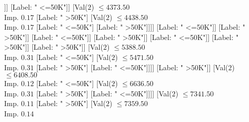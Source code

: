 \documentclass[margin=10pt]{standalone}
\begin{document}
\begin{forest}
																																									[Val($2$) $ \leq 4246.50$ \\ Imp. $0.09$
																																										[Val($2$) $ \leq 4235.50$ \\ Imp. $0.06$
																																											[Val($2$) $ \leq 3975.50$ \\ Imp. $0.02$
																																												[Label: " <=50K"]
																																												[Val($2$) $ \leq 3988.50$ \\ Imp. $0.31$
																																													[Label: " >50K"]
																																													[Label: " <=50K"]]]
																																											[Label: " <=50K"]]
																																										[Val($2$) $ \leq 4373.50$ \\ Imp. $0.17$
																																											[Label: " >50K"]
																																											[Val($2$) $ \leq 4438.50$ \\ Imp. $0.17$
																																												[Label: " <=50K"]
																																												[Label: " >50K"]]]]
																																									[Label: " <=50K"]]
																																								[Label: " >50K"]]
																																							[Label: " <=50K"]]
																																						[Label: " >50K"]]
																																					[Label: " <=50K"]]
																																				[Label: " >50K"]]
																																			[Label: " >50K"]]
																																		[Val($2$) $ \leq 5388.50$ \\ Imp. $0.31$
																																			[Label: " <=50K"]
																																			[Val($2$) $ \leq 5471.50$ \\ Imp. $0.31$
																																				[Label: " >50K"]
																																				[Label: " <=50K"]]]]
																																	[Label: " >50K"]]
																																[Val($2$) $ \leq 6408.50$ \\ Imp. $0.12$
																																	[Label: " <=50K"]
																																	[Val($2$) $ \leq 6636.50$ \\ Imp. $0.31$
																																		[Label: " >50K"]
																																		[Label: " <=50K"]]]]
																															[Val($2$) $ \leq 7341.50$ \\ Imp. $0.11$
																																[Label: " >50K"]
																																[Val($2$) $ \leq 7359.50$ \\ Imp. $0.14$

\end{forest}
\end{document}
